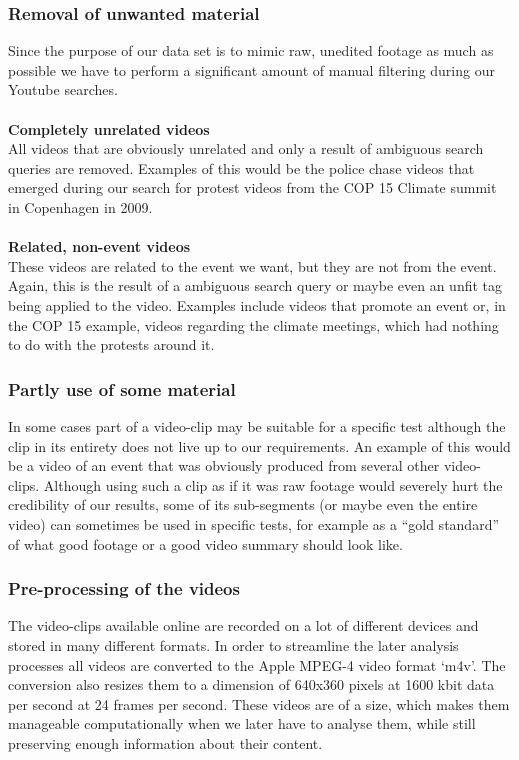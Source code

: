 \subsubsection{Removal of unwanted material}
%
Since the purpose of our data set is to mimic raw, unedited footage as much as possible we have to perform a significant amount of manual filtering during our Youtube searches.\\\\
%
\textbf{Completely unrelated videos}\\
%
All videos that are obviously unrelated and only a result of ambiguous search queries are removed. Examples of this would be the police chase videos that emerged during our search for protest videos from the COP 15 Climate summit in Copenhagen in 2009.\\\\
%
\textbf{Related, non-event videos}\\
%
These videos are related to the event we want, but they are not from the event. Again, this is the result of a ambiguous search query or maybe even an unfit tag being applied to the video. Examples include videos that promote an event or, in the COP 15 example, videos regarding the climate meetings, which had nothing to do with the protests around it.
%
\subsubsection{Partly use of some material}
%
In some cases part of a video-clip may be suitable for a specific test although the clip in its entirety does not live up to our requirements. An example of this would be a video of an event that was obviously produced from several other video-clips. Although using such a clip as if it was raw footage would severely hurt the credibility of our results, some of its sub-segments (or maybe even the entire video) can sometimes be used in specific tests, for example as a “gold standard” of what good footage or a good video summary should look like.
\subsubsection{Pre-processing of the videos}
%
The video-clips available online are recorded on a lot of different devices and stored in many different formats. In order to streamline the later analysis processes all videos are converted to the Apple MPEG-4 video format ‘m4v’. The conversion also resizes them to a dimension of 640x360 pixels at 1600 kbit data per second at 24 frames per second. These videos are of a size, which makes them manageable computationally when we later have to analyse them, while still preserving enough information about their content. %
%
